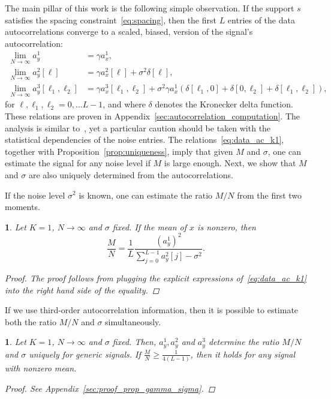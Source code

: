 \documentclass[english,11pt]{article}
\numberwithin{equation}{section}
\theoremstyle{plain}
\theoremstyle{definition}
\theoremstyle{remark}
\theoremstyle{plain}
\theoremstyle{remark}
\theoremstyle{plain}
\theoremstyle{plain}
\newtheorem{proposition}[thm]{\protect\propositionname}
\providecommand{\propositionname}{Proposition}
\begin{document}
The main pillar of this work is the following simple observation.
If the support $s$ satisfies the spacing constraint~\eqref{eq:spacing}, then the first $L$ entries of the data autocorrelations converge 
to a scaled, biased, version of the signal's autocorrelation:
\begin{align} \label{eq:data_ac_k1}
\lim_{N\to\infty} a_y^1 &= \gamma a_{x}^1, \nonumber\\
\lim_{N\to\infty} a_y^2[\ell] &= \gamma a_{x}^2[\ell] +\sigma^2\delta[\ell],\\
\lim_{N\to\infty} a_y^3[\ell_1,\ell_2] &= \gamma a_{x}^3[\ell_1,\ell_2] + \sigma^2\gamma a_{x}^1(\delta[\ell_1,0]+\delta[0,\ell_2]+\delta[\ell_1,\ell_2]), \nonumber
\end{align}
for $\ell,\ell_1,\ell_2=0,\ldots L-1$, and where $\delta$ denotes the Kronecker delta function. 
These relations are proven in Appendix~\ref{sec:autocorrelation_computation}. The analysis is similar to~\cite{bendory2017bispectrum,boumal2017heterogeneous}, yet a particular caution should be taken with the statistical dependencies of the noise entries. 
The relations~\eqref{eq:data_ac_k1}, together with Proposition~\ref{prop:uniqueness}, imply that given $M$ and $\sigma$, one can estimate the signal for any noise level if $M$ is large enough. Next, we show that  $M$ and $\sigma$ are also uniquely determined from the autocorrelations. 

If the noise level $\sigma^2$ is known, one can estimate the ratio $M/N$ from the first two moments.
\begin{proposition} \label{prop:gamma}
	Let $K=1$, $N\to\infty$ and $\sigma$ fixed. If the mean of $x$ is nonzero, then 
	\begin{equation*}
	\frac{M}{N} = \frac{1}{L}\frac{(a^1_y)^2}{\sum_{j=0}^{L-1}a_y^2[j]-\sigma^2}.
	\end{equation*}
	\begin{proof}
The proof follows from plugging the explicit expressions of~\eqref{eq:data_ac_k1} into the right hand side of the equality.
\end{proof}
\end{proposition}

If we use third-order autocorrelation information, then it is possible to estimate both the ratio $M/N$ and $\sigma$ simultaneously.
\begin{proposition} \label{prop:gamma_sigma}
	Let $K=1$, $N\to\infty$ and $\sigma$ fixed. Then, $a_y^1,a_y^2$ and  $a_y^3$ determine the ratio $M/N$ and $\sigma$ uniquely for generic signals. If $\frac{M}{N}\geq\frac{1}{4(L-1)}$, then it holds for any signal with nonzero mean. 
	\begin{proof}
		See Appendix~\ref{sec:proof_prop_gamma_sigma}.
	\end{proof}
\end{proposition}
\end{document}
